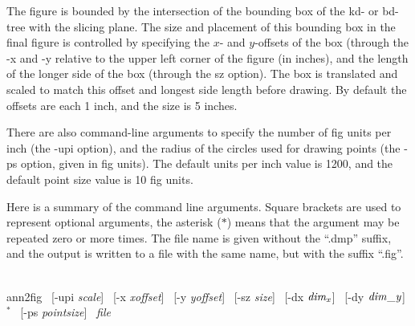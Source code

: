 \documentclass[11pt]{article}		%
\begin{document}
The figure is bounded by the intersection of the bounding box of the kd-
or bd-tree with the slicing plane.  The size and placement of this bounding
box in the final figure is controlled by specifying the $x$- and $y$-offsets
of the box (through the \textsf{-x} and \textsf{-y} relative to the upper left
corner of the figure (in inches), and the length of the longer side of the
box (through the \textsf{sz} option).  The box is translated and scaled to
match this offset and longest side length before drawing.  By default the
offsets are each 1 inch, and the size is 5 inches.

There are also command-line arguments to specify the number of fig units
per inch (the \textsf{-upi} option), and the radius of the circles used for
drawing points (the \textsf{-ps} option, given in fig units).  The default
units per inch value is 1200, and the default point size value is 10
fig units.

Here is a summary of the command line arguments.  Square brackets are
used to represent optional arguments, the asterisk ($*$) means that
the argument may be repeated zero or more times.  The file name is given
without the ``.dmp'' suffix, and the output is written to a file with
the same name, but with the suffix ``.fig''.

\begin{obeylines}
~
\qquad	\textsf{ann2fig} ~[\textsf{-upi} \textit{scale}] ~[\textsf{-x} \textit{xoffset}] ~[\textsf{-y} \textit{yoffset}] ~[\textsf{-sz} \textit{size}] ~[\textsf{-dx} $\it dim_x$] ~[\textsf{-dy} $\it dim\_y$]
\qquad{}$^*$ ~[\textsf{-ps} \textit{pointsize}] ~\textit{file}
\end{obeylines}

\newpage

\end{document}
